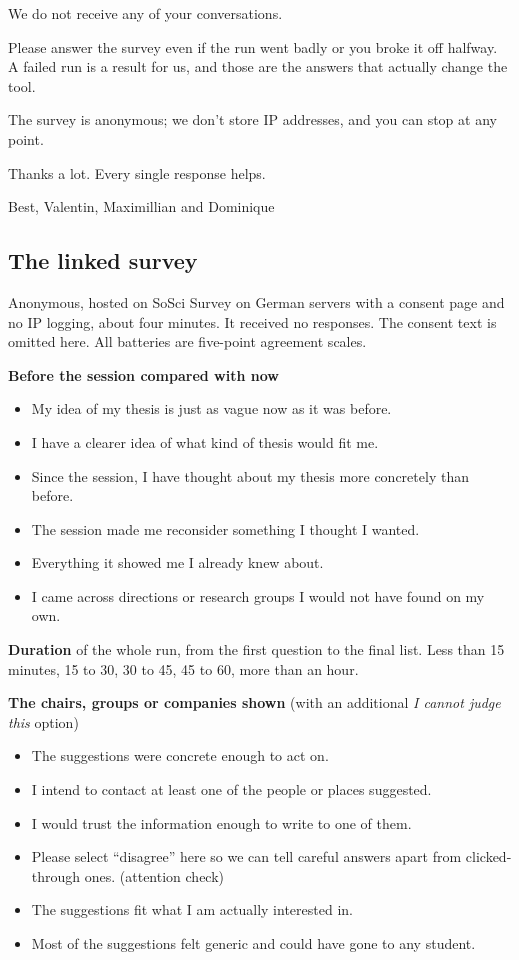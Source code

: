 \documentclass[11pt,a4paper]{article}
\begin{document}
\noindent We do not receive any of your conversations.

\medskip
\noindent Please answer the survey even if the run went badly or you broke it off
halfway. A failed run is a result for us, and those are the answers that actually
change the tool.

\medskip
\noindent The survey is anonymous; we don't store IP addresses, and you can stop
at any point.

\medskip
\noindent Thanks a lot. Every single response helps.

\medskip
\noindent Best, Valentin, Maximillian and Dominique

\subsection*{The linked survey}

\noindent Anonymous, hosted on SoSci Survey on German servers with a consent
page and no IP logging, about four minutes. It received no responses. The
consent text is omitted here. All batteries are five-point agreement scales.

\medskip
\noindent \textbf{Before the session compared with now}

\begin{itemize}[leftmargin=1.4em,itemsep=0.2em]
  \item My idea of my thesis is just as vague now as it was before.
  \item I have a clearer idea of what kind of thesis would fit me.
  \item Since the session, I have thought about my thesis more concretely than before.
  \item The session made me reconsider something I thought I wanted.
  \item Everything it showed me I already knew about.
  \item I came across directions or research groups I would not have found on my own.
\end{itemize}

\noindent \textbf{Duration} of the whole run, from the first question to the
final list. Less than 15 minutes, 15 to 30, 30 to 45, 45 to 60, more than an
hour.

\medskip
\noindent \textbf{The chairs, groups or companies shown} (with an additional
\emph{I cannot judge this} option)

\begin{itemize}[leftmargin=1.4em,itemsep=0.2em]
  \item The suggestions were concrete enough to act on.
  \item I intend to contact at least one of the people or places suggested.
  \item I would trust the information enough to write to one of them.
  \item Please select ``disagree'' here so we can tell careful answers apart from
 clicked-through ones. (attention check)
  \item The suggestions fit what I am actually interested in.
  \item Most of the suggestions felt generic and could have gone to any student.
\end{itemize}
\end{document}
